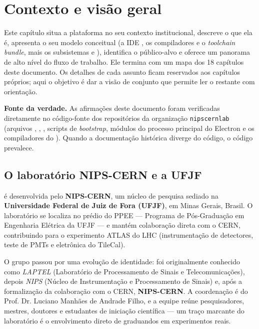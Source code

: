 \chapter{Contexto e visão geral}
\label{cap:01-contexto-visao-geral}

Este capítulo situa a plataforma  no seu contexto institucional,
descreve o que ela é, apresenta o seu modelo conceitual (a IDE ,
os compiladores  e o \emph{toolchain bundle}, mais os subsistemas
 e ), identifica o público-alvo e oferece
um panorama de alto nível do fluxo de trabalho. Ele termina com um mapa dos 18
capítulos deste documento. Os detalhes de cada assunto ficam reservados aos
capítulos próprios; aqui o objetivo é dar a visão de conjunto que permite ler o
restante com orientação.

\begin{nota}
\textbf{Fonte da verdade.} As afirmações deste documento foram verificadas
diretamente no código-fonte dos repositórios da organização
\texttt{nipscernlab} (arquivos , ,
, scripts de \emph{bootstrap}, módulos do processo principal do
Electron e os compiladores do ). Quando a documentação histórica
diverge do código, o código prevalece.
\end{nota}

\section{O laboratório NIPS-CERN e a UFJF}
\label{sec:01-nipscern}

 é desenvolvida pelo \textbf{NIPS-CERN}, um núcleo de pesquisa
sediado na \textbf{Universidade Federal de Juiz de Fora (UFJF)}, em Minas
Gerais, Brasil. O laboratório se localiza no prédio do PPEE --- Programa de
Pós-Graduação em Engenharia Elétrica da UFJF --- e mantém colaboração direta
com o CERN, contribuindo para o experimento ATLAS do LHC (instrumentação de
detectores, teste de PMTs e eletrônica do TileCal).

O grupo passou por uma evolução de identidade: foi originalmente conhecido como
\emph{LAPTEL} (Laboratório de Processamento de Sinais e Telecomunicações),
depois \emph{NIPS} (Núcleo de Instrumentação e Processamento de Sinais) e,
após a formalização da colaboração com o CERN, \textbf{NIPS-CERN}. A coordenação
é do Prof. Dr. Luciano Manhães de Andrade Filho, e a equipe reúne pesquisadores,
mestres, doutores e estudantes de iniciação científica --- um traço marcante do
laboratório é o envolvimento direto de graduandos em experimentos reais.


